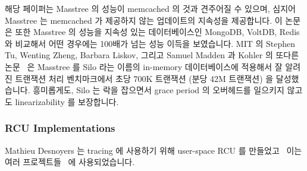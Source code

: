 해당 페이퍼는 Masstree 의 성능이 memcached 의 것과 견주어질 수 있으며, 심지어
Masstree 는 memcached 가 제공하지 않는 업데이트의 지속성을 제공합니다.
이 논문은 또한 Masstree 의 성능을 지속성 있는 데이터베이스인 MongoDB, VoltDB,
Redis 와 비교해서 어떤 경우에는 100배가 넘는 성능 이득을 보였습니다.
MIT 의 Stephen Tu, Wenting Zheng, Barbara Liskov, 그리고 Samuel Madden 과
Kohler 의 또다른 논문~\cite{Tu:2013:STM:2517349.2522713} 은 Masstree 를 Silo
라는 이름의 in-memory 데이터베이스에 적용해서 잘 알려진 트랜잭션 처리
벤치마크에서 초당 700K 트랜잭션 (분당 42M 트랜잭션) 을 달성했습니다.
흥미롭게도, Silo 는 락을 잡으면서 grace period 의 오버헤드를 일으키지 않고도
linearizability 를 보장합니다.
\iffalse

Yandong Mao and Robert Morris of MIT and Eddie Kohler of
Harvard University created another RCU-protected tree named
Masstree~\cite{Mao:2012:CCF:2168836.2168855} that combines ideas from B+
trees and tries.
Although this tree is about 2.5x slower than an RCU-protected hash table,
it supports operations on key ranges, unlike hash tables.
In addition, Masstree supports efficient storage of objects with long
shared key prefixes and, furthermore, provides persistence via logging
to mass storage.

The paper notes that Masstree's performance rivals that of memcached, even
given that Masstree is persistently storing updates and memcached is not.
The paper also compares Masstree's performance to the persistent
datastores MongoDB, VoltDB, and Redis, reporting significant performance
advantages for Masstree, in some cases exceeding two orders of magnitude.
Another paper~\cite{Tu:2013:STM:2517349.2522713}, by Stephen Tu,
Wenting Zheng, Barbara Liskov, and Samuel Madden of MIT and Kohler,
applies Masstree to an in-memory database named Silo, achieving 700K
transactions per second (42M transactions per minute) on a well-known
transaction-processing benchmark.
Interestingly enough, Silo guarantees linearizability without incurring
the overhead of grace periods while holding locks.
\fi

\subsubsection{RCU Implementations}
\label{sec:defer:RCU Implementations}

Mathieu Desnoyers 는 tracing 에 사용하기 위해 user-space RCU 를
만들었고~\cite{MathieuDesnoyersPhD,MathieuDesnoyers2012URCU} 이는 여러
프로젝트들~\cite{MikeDay2013RCUqemu} 에 사용되었습니다.

